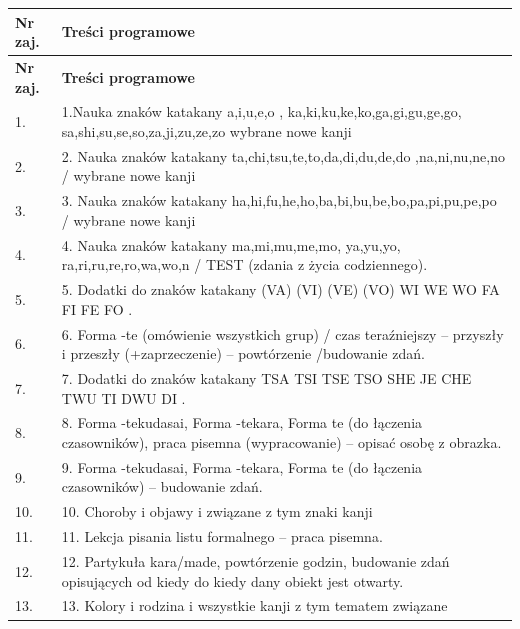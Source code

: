 \documentclass[12pt, a4paper]{article}
\newcommand{\thdrule}{\noalign{\global\setlength{\extrarowheight}{0pt}}}
\newcommand{\thdend}{\noalign{\global\setlength{\extrarowheight}{3pt}}}
\begin{document}
{\scriptsize
\begin{longtable}{m{1.5cm}m{14.5cm}}
\thdrule\toprule
\rowcolor{pjatkRed} {\color{white}\textbf{Nr zaj.}} & {\color{white}\textbf{Treści programowe}} \\
\midrule\thdend
\endfirsthead
\thdrule\toprule
\rowcolor{pjatkRed} {\color{white}\textbf{Nr zaj.}} & {\color{white}\textbf{Treści programowe}} \\
\midrule\thdend
\endhead
  \rowcolor{tableRowLight} 1. & 1.Nauka znaków katakany a,i,u,e,o , ka,ki,ku,ke,ko,ga,gi,gu,ge,go, sa,shi,su,se,so,za,ji,zu,ze,zo wybrane nowe kanji \\
  \rowcolor{tableRowAlt} 2. & 2.  Nauka znaków katakany ta,chi,tsu,te,to,da,di,du,de,do ,na,ni,nu,ne,no / wybrane nowe kanji \\
  \rowcolor{tableRowLight} 3. & 3. Nauka znaków katakany ha,hi,fu,he,ho,ba,bi,bu,be,bo,pa,pi,pu,pe,po / wybrane nowe kanji \\
  \rowcolor{tableRowAlt} 4. & 4. Nauka znaków katakany ma,mi,mu,me,mo, ya,yu,yo, ra,ri,ru,re,ro,wa,wo,n   / TEST (zdania z życia codziennego). \\
  \rowcolor{tableRowLight} 5. & 5.  Dodatki do znaków katakany  (VA) (VI)  (VE)  (VO) WI WE  WO FA FI FE FO . \\
  \rowcolor{tableRowAlt} 6. & 6.  Forma -te (omówienie wszystkich grup) / czas teraźniejszy – przyszły i przeszły (+zaprzeczenie) – powtórzenie /budowanie zdań. \\
  \rowcolor{tableRowLight} 7. & 7.  Dodatki do znaków katakany  TSA TSI TSE TSO SHE JE CHE TWU TI DWU DI . \\
  \rowcolor{tableRowAlt} 8. & 8.  Forma -tekudasai, Forma -tekara, Forma te (do łączenia czasowników), praca pisemna (wypracowanie) – opisać osobę z obrazka. \\
  \rowcolor{tableRowLight} 9. & 9.  Forma -tekudasai, Forma -tekara, Forma te (do łączenia czasowników) – budowanie zdań. \\
  \rowcolor{tableRowAlt} 10. & 10.  Choroby i objawy i związane z tym znaki kanji \\
  \rowcolor{tableRowLight} 11. & 11.  Lekcja pisania listu formalnego – praca pisemna. \\
  \rowcolor{tableRowAlt} 12. & 12.  Partykuła kara/made, powtórzenie godzin, budowanie zdań opisujących od kiedy do kiedy dany obiekt jest otwarty. \\
  \rowcolor{tableRowLight} 13. & 13.  Kolory i rodzina i wszystkie kanji z tym tematem związane \\

\end{longtable}}
\end{document}

